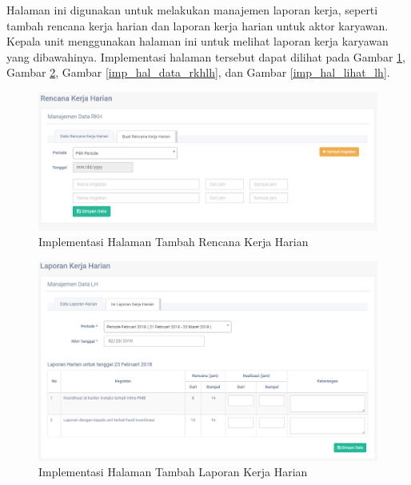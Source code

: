 \begin{enumerate}
            Halaman ini digunakan untuk melakukan manajemen laporan kerja, seperti tambah rencana kerja harian dan laporan kerja harian untuk aktor karyawan. Kepala unit menggunakan halaman ini untuk melihat laporan kerja karyawan yang dibawahinya. Implementasi halaman tersebut dapat dilihat pada Gambar \ref{imp_hal_tambah_rkh}, Gambar \ref{imp_hal_tambah_lh}, Gambar \ref{imp_hal_data_rkhlh}, dan Gambar \ref{imp_hal_lihat_lh}.
            \begin{figure}[H]
                \centering
                \includegraphics[width=14cm]{gambar/halaman/halaman-tambah-rkh}
                \caption{Implementasi Halaman Tambah Rencana Kerja Harian}
                \label{imp_hal_tambah_rkh}
            \end{figure}
            \begin{figure}[H]
                \centering
                \includegraphics[width=14cm]{gambar/halaman/halaman-tambah-lh}
                \caption{Implementasi Halaman Tambah Laporan Kerja Harian}
                \label{imp_hal_tambah_lh}
            \end{figure}
            \begin{figure}[H]
                \centering

\end{figure}
\end{enumerate}
